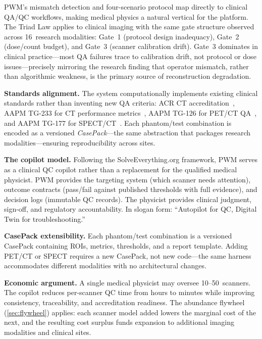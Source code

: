 PWM's mismatch detection and four-scenario protocol map directly to
clinical QA/QC workflows, making medical physics a natural vertical for
the platform.  The Triad Law applies to clinical imaging with the same
gate structure observed across 16~research modalities: Gate~1 (protocol
design inadequacy), Gate~2 (dose/count budget), and Gate~3 (scanner
calibration drift).  Gate~3 dominates in clinical practice---most QA
failures trace to calibration drift, not protocol or dose
issues---precisely mirroring the research finding that operator mismatch,
rather than algorithmic weakness, is the primary source of
reconstruction degradation.

\medskip
\noindent
\textbf{Standards alignment.}
The system computationally implements existing clinical standards rather
than inventing new QA criteria: ACR CT
accreditation~\cite{acr_ct_accreditation}, AAPM TG-233 for CT
performance metrics~\cite{aapm_tg233}, AAPM TG-126 for PET/CT
QA~\cite{aapm_tg126}, and AAPM TG-177 for
SPECT/CT~\cite{aapm_tg177}.  Each phantom/test combination is encoded
as a versioned \emph{CasePack}---the same abstraction that packages
research modalities---ensuring reproducibility across sites.

\medskip
\noindent
\textbf{The copilot model.}
Following the SolveEverything.org framework, PWM serves as a clinical QC
copilot rather than a replacement for the qualified medical physicist.
PWM provides the targeting system (which scanner needs attention),
outcome contracts (pass/fail against published thresholds with full
evidence), and decision logs (immutable QC records).  The physicist
provides clinical judgment, sign-off, and regulatory accountability.  In
slogan form: ``Autopilot for QC, Digital Twin for troubleshooting.''

\medskip
\noindent
\textbf{CasePack extensibility.}
Each phantom/test combination is a versioned CasePack containing ROIs,
metrics, thresholds, and a report template.  Adding PET/CT or SPECT
requires a new CasePack, not new code---the same harness accommodates
different modalities with no architectural changes.

\medskip
\noindent
\textbf{Economic argument.}
A single medical physicist may oversee 10--50~scanners.  The copilot
reduces per-scanner QC time from hours to minutes while improving
consistency, traceability, and accreditation readiness.  The abundance
flywheel (\cref{sec:flywheel}) applies: each scanner model added lowers
the marginal cost of the next, and the resulting cost surplus funds
expansion to additional imaging modalities and clinical sites.
